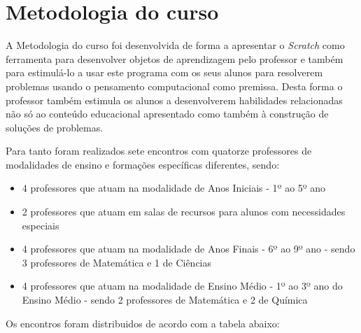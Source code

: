 \documentclass[12pt, openright, a4paper, brazil, english, french, spanish, bibjustif, openany, oneside]{abntex2}
\begin{document}

\chapter{Metodologia do curso}

A Metodologia do curso foi desenvolvida de forma a apresentar o \textit{Scratch} como ferramenta para desenvolver objetos de aprendizagem pelo professor e também para estimulá-lo a usar este programa com os seus alunos para resolverem problemas usando o pensamento computacional como premissa. Desta forma o professor também estimula os alunos a desenvolverem habilidades relacionadas não só ao conteúdo educacional apresentado como também à construção de soluções de problemas. 

Para tanto foram realizados sete encontros com quatorze professores de modalidades de ensino e formações específicas diferentes, sendo:

\begin{itemize}

\item 4 professores que atuam na modalidade de Anos Iniciais - 1º ao 5º ano
\item 2 professores que atuam em salas de recursos para alunos com necessidades especiais
\item 4 professores que atuam na modalidade de Anos Finais - 6º ao 9º ano - sendo 3 professores de Matemática e 1 de Ciências
\item 4 professores que atuam na modalidade de Ensino Médio - 1º ao 3º ano do Ensino Médio - sendo 2 professores de Matemática e 2 de Química

\end{itemize}


Os encontros foram distribuidos de acordo com a tabela abaixo: 
\end{document}
